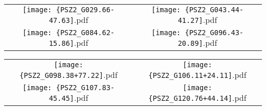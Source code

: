 \documentclass[apj, revtex4-1]{emulateapj}
\newcommand{\sdssg}{\hbox{$g$}}
\newcommand{\sdssr}{\hbox{$r$}}
\newcommand{\sdssi}{\hbox{$i$}}
\begin{document}
\begin{figure*}
	\centering
	\begin{tabular}{cc}
		\texttt{[image: \{PSZ2\_G029.66-47.63]}.pdf}&
		\texttt{[image: \{PSZ2\_G043.44-41.27]}.pdf}\\
		\texttt{[image: \{PSZ2\_G084.62-15.86]}.pdf}&
		\texttt{[image: \{PSZ2\_G096.43-20.89]}.pdf}
	\end{tabular}
	\caption{RGB (\sdssi\sdssr\sdssg) color images for four PSZ clusters optically confirmed using our optical imaging. Each panel is centered on the cluster's BCG and has a width of 1 Mpc at the corresponding cluster's redshift. The horizontal bar in the lower right of each panel shows the scale of the panel, where north is up and east is to the left. The location of the PSZ detection is denoted by a red star. The dashed and solid, concentric, red circles are $2'$ and $5'$ in radius respectively.}
	\label{fig:Clusters1}
\end{figure*}

\begin{figure*}
	\centering
	\begin{tabular}{cc}
		\texttt{[image: \{PSZ2\_G098.38+77.22]}.pdf}&
		\texttt{[image: \{PSZ2\_G106.11+24.11]}.pdf}\\
		\texttt{[image: \{PSZ2\_G107.83-45.45]}.pdf}&
		\texttt{[image: \{PSZ2\_G120.76+44.14]}.pdf}
	\end{tabular}
	\caption{Same as Figure \ref{fig:Clusters1}.}
	\label{fig:Clusters2}
\end{figure*}
\end{document}
